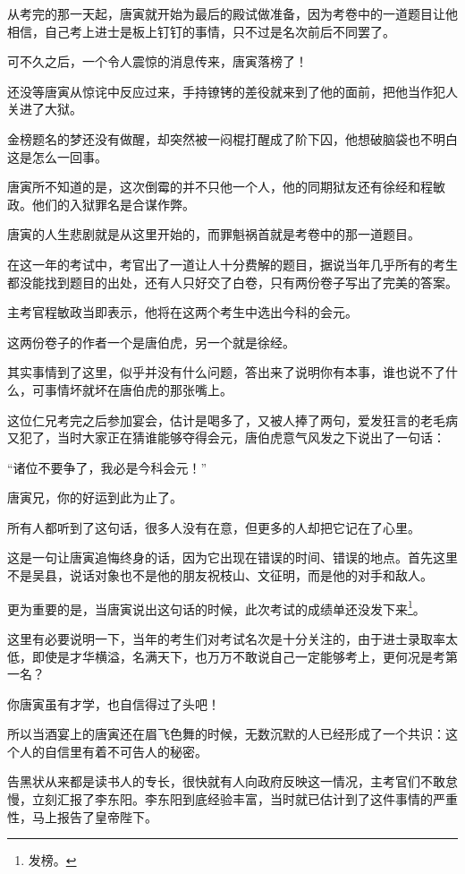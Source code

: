 \begin{multicols}{\theparacolNo}
		从考完的那一天起，唐寅就开始为最后的殿试做准备，因为考卷中的一道题目让他相信，自己考上进士是板上钉钉的事情，只不过是名次前后不同罢了。

		可不久之后，一个令人震惊的消息传来，唐寅落榜了！

		还没等唐寅从惊诧中反应过来，手持镣铐的差役就来到了他的面前，把他当作犯人关进了大狱。

		金榜题名的梦还没有做醒，却突然被一闷棍打醒成了阶下囚，他想破脑袋也不明白这是怎么一回事。

		唐寅所不知道的是，这次倒霉的并不只他一个人，他的同期狱友还有徐经和程敏政。他们的入狱罪名是合谋作弊。

		唐寅的人生悲剧就是从这里开始的，而罪魁祸首就是考卷中的那一道题目。

		在这一年的考试中，考官出了一道让人十分费解的题目，据说当年几乎所有的考生都没能找到题目的出处，还有人只好交了白卷，只有两份卷子写出了完美的答案。

		主考官程敏政当即表示，他将在这两个考生中选出今科的会元。

		这两份卷子的作者一个是唐伯虎，另一个就是徐经。

		其实事情到了这里，似乎并没有什么问题，答出来了说明你有本事，谁也说不了什么，可事情坏就坏在唐伯虎的那张嘴上。

		这位仁兄考完之后参加宴会，估计是喝多了，又被人捧了两句，爱发狂言的老毛病又犯了，当时大家正在猜谁能够夺得会元，唐伯虎意气风发之下说出了一句话：

		“诸位不要争了，我必是今科会元！”

		唐寅兄，你的好运到此为止了。

		所有人都听到了这句话，很多人没有在意，但更多的人却把它记在了心里。

		这是一句让唐寅追悔终身的话，因为它出现在错误的时间、错误的地点。首先这里不是吴县，说话对象也不是他的朋友祝枝山、文征明，而是他的对手和敌人。

		更为重要的是，当唐寅说出这句话的时候，此次考试的成绩单还没发下来\footnote{发榜。}。

		这里有必要说明一下，当年的考生们对考试名次是十分关注的，由于进士录取率太低，即使是才华横溢，名满天下，也万万不敢说自己一定能够考上，更何况是考第一名？

		你唐寅虽有才学，也自信得过了头吧！

		所以当酒宴上的唐寅还在眉飞色舞的时候，无数沉默的人已经形成了一个共识：这个人的自信里有着不可告人的秘密。

		告黑状从来都是读书人的专长，很快就有人向政府反映这一情况，主考官们不敢怠慢，立刻汇报了李东阳。李东阳到底经验丰富，当时就已估计到了这件事情的严重性，马上报告了皇帝陛下。


\end{multicols}
